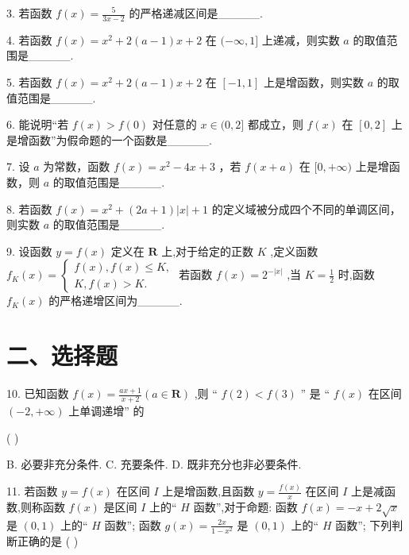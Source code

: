 3. 若函数 $f\left( x\right)  = \frac{5}{{3x} - 2}$ 的严格递减区间是\_\_\_\_\_.

4. 若函数 $f\left( x\right)  = {x}^{2} + 2\left( {a - 1}\right) x + 2$ 在 $( - \infty ,1\rbrack$ 上递减，则实数 $a$ 的取值范围是\_\_\_\_\_.

5. 若函数 $f\left( x\right)  = {x}^{2} + 2\left( {a - 1}\right) x + 2$ 在 $\left\lbrack  {-1,1}\right\rbrack$ 上是增函数，则实数 $a$ 的取值范围是\_\_\_\_\_.

6. 能说明“若 $f\left( x\right)  > f\left( 0\right)$ 对任意的 $x \in  (0,2\rbrack$ 都成立，则 $f\left( x\right)$ 在 $\left\lbrack  {0,2}\right\rbrack$ 上是增函数”为假命题的一个函数是\_\_\_\_\_.

7. 设 $a$ 为常数，函数 $f\left( x\right)  = {x}^{2} - {4x} + 3$ ，若 $f\left( {x + a}\right)$ 在 $\lbrack 0, + \infty )$ 上是增函数，则 $a$ 的取值范围是\_\_\_\_\_.

8. 若函数 $f\left( x\right)  = {x}^{2} + \left( {{2a} + 1}\right) \left| x\right|  + 1$ 的定义域被分成四个不同的单调区间，则实数 $a$ 的取值范围是\_\_\_\_\_.

9. 设函数 $y = f\left( x\right)$ 定义在 $\mathbf{R}$ 上,对于给定的正数 $K$ ,定义函数 ${f}_{K}\left( x\right)  = \left\{  \begin{array}{l} f\left( x\right) ,f\left( x\right)  \leq  K, \\  K,f\left( x\right)  > K. \end{array}\right.$ 若函数 $f\left( x\right)  = {2}^{-\left| x\right| }$ ,当 $K = \frac{1}{2}$ 时,函数 ${f}_{K}\left( x\right)$ 的严格递增区间为\_\_\_\_\_.

\section*{二、选择题}

10. 已知函数 $f\left( x\right)  = \frac{{ax} + 1}{x + 2}\left( {a \in  \mathbf{R}}\right)$ ,则 “ $f\left( 2\right)  < f\left( 3\right)$ ” 是 “ $f\left( x\right)$ 在区间 $\left( {-2, + \infty }\right)$ 上单调递增” 的

( )

B. 必要非充分条件. C. 充要条件. D. 既非充分也非必要条件.

11. 若函数 $y = f\left( x\right)$ 在区间 $I$ 上是增函数,且函数 $y = \frac{f\left( x\right) }{x}$ 在区间 $I$ 上是减函数,则称函数 $f\left( x\right)$ 是区间 $I$ 上的“ $H$ 函数”,对于命题:  函数 $f\left( x\right)  =  - x + 2\sqrt{x}$ 是 $\left( {0,1}\right)$ 上的“ $H$ 函数”;   函数 $g\left( x\right)  = \frac{2x}{1 - {x}^{2}}$ 是 $\left( {0,1}\right)$ 上的“ $H$ 函数”; 下列判断正确的是 ( )

